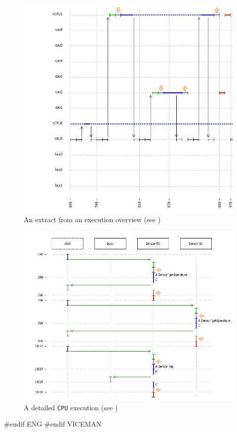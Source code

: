 \documentclass[\pformat,12pt]{article}
\begin{document}
\begin{figure}
\begin{center}
\includegraphics[width=\textwidth]{exeoverview.png}
\end{center}
\caption{An extract from an execution overview (see \cite{VICEGuide-CSK})}
\label{fig:exeoverview}
\end{figure}

\begin{figure}
\begin{center}
\includegraphics[width=\textwidth]{detailedexe.png}
\end{center}
\caption{A detailed \texttt{CPU} execution (see \cite{VICEGuide-CSK})}
\label{fig:detailedexe}
\end{figure}
#endif ENG
#endif VICEMAN
\end{document}
